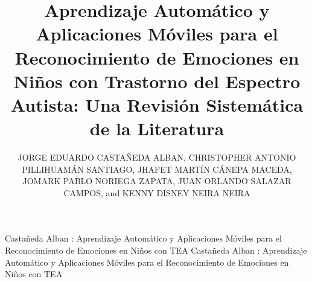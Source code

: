 \documentclass{ieeeaccess}
\begin{document}
	
	
	\title{Aprendizaje Automático y Aplicaciones Móviles para el Reconocimiento de Emociones en Niños con Trastorno del Espectro Autista: Una Revisión Sistemática de la Literatura}
	
	\author{\uppercase{Jorge Eduardo Castañeda Alban},
		\uppercase{Christopher Antonio Pillihuamán Santiago},
		\uppercase{Jhafet Martín Cánepa Maceda},
		\uppercase{Jomark Pablo Noriega Zapata},
		\uppercase{Juan Orlando Salazar Campos}, and
		\uppercase{Kenny Disney Neira Neira}}
	
	\address[1]{Universidad San Ignacio de Loyola, Facultad de Ingeniería, Programa de Ingeniería de Sistemas de Información, Lima, Perú (e-mail: jcastanedaa@usil.edu.pe; c.pillihuaman@usil.pe; jhafet.canepa@usil.pe; jnoriegaz@usil.edu.pe; jsalazarc@usil.edu.pe; kneira@usil.edu.pe)}
	
	
	\markboth
	{Castañeda Alban \headeretal: Aprendizaje Automático y Aplicaciones Móviles para el Reconocimiento de Emociones en Niños con TEA}
	{Castañeda Alban \headeretal: Aprendizaje Automático y Aplicaciones Móviles para el Reconocimiento de Emociones en Niños con TEA}
	
	
\end{document}
